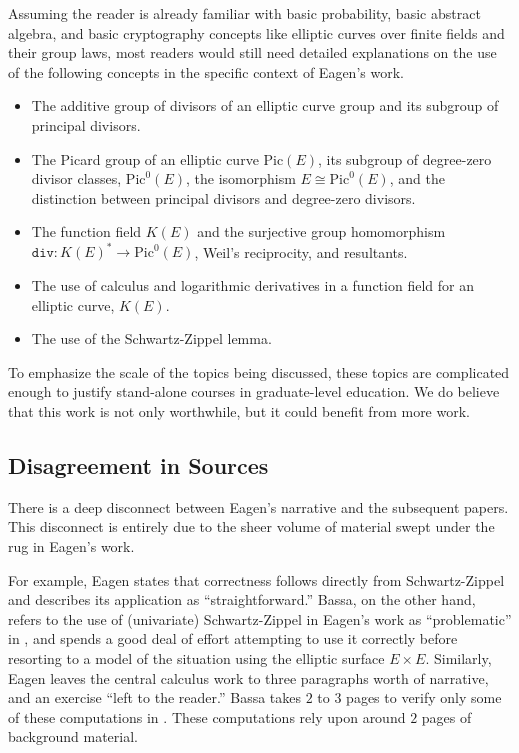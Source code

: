 \documentclass{article}
\theoremstyle{definition}
\newcommand{\6}{\mathbf}
\newcommand{\7}{\mathcal}
\begin{document}
Assuming the reader is already familiar with basic probability, basic abstract algebra, and basic cryptography concepts like elliptic curves over finite fields and their group laws, most readers would still need detailed explanations on the use of the following concepts in the specific context of Eagen's work.
\begin{itemize}
\item The additive group of divisors of an elliptic curve group and its subgroup of principal divisors.
\item The Picard group of an elliptic curve $\text{Pic}(E)$, its subgroup of degree-zero divisor classes, $\text{Pic}^0(E)$, the isomorphism $E \cong \text{Pic}^0(E)$, and the distinction between principal divisors and degree-zero divisors.
\item The function field $K(E)$ and the surjective group homomorphism $\texttt{div}:K(E)^* \to \text{Pic}^0(E)$, Weil's reciprocity, and resultants.
\item The use of calculus and logarithmic derivatives in a function field for an elliptic curve, $K(E)$.
\item The use of the Schwartz-Zippel lemma.
\end{itemize}

To emphasize the scale of the topics being discussed, these topics are complicated enough to justify stand-alone courses in  graduate-level education. We do believe that this work is not only worthwhile, but it could benefit from more work.



\subsection{Disagreement in Sources}

There is a deep disconnect between Eagen's narrative and the subsequent papers. This disconnect is entirely due to the sheer volume of material swept under the rug in Eagen's work.

For example, Eagen states that correctness follows directly from Schwartz-Zippel and describes its application as ``straightforward.''  Bassa, on the other hand, refers to the use of (univariate) Schwartz-Zippel in Eagen's work as ``problematic'' in \cite{BassaSoundnessProofSoP}, and spends a good deal of effort attempting to use it correctly before resorting to a model of the situation using the elliptic surface $E \times E$. 
Similarly, Eagen leaves the central calculus work to three paragraphs worth of narrative, and an exercise ``left to the reader.'' Bassa takes $2$ to $3$ pages to verify only some of these computations in \cite{BassaLogDerivSoP}. These computations rely upon around $2$ pages of background material. 
\end{document}
